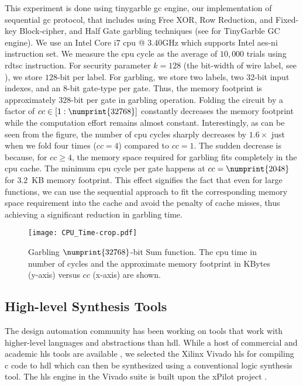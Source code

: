 This experiment is done using \gls{tinygarble} \acrshort{gc} engine, our  implementation of sequential \acrshort{gc} protocol, that includes using Free XOR, Row Reduction, and Fixed-key Block-cipher, and Half Gate garbling techniques (see  for TinyGarble GC engine).
We use an Intel Core i7 \acrshort{cpu} @ 3.40GHz which supports Intel \acrfull{aes-ni} instruction set.
We measure the \acrshort{cpu} cycle as the average of $10,000$ trials using \gls{rdtsc} instruction.
For security parameter $k=128$ (the bit-width of wire label, see ), we store $128$-bit per label.
For garbling, we store two labels, two 32-bit input indexes, and an 8-bit gate-type per gate.
Thus, the memory footprint is approximately $328$-bit per gate in garbling operation.
Folding the circuit by a factor of $cc \in [1:\numprint{32768}]$ constantly decreases the memory footprint while the computation effort remains almost constant.
Interestingly, as can be seen from the figure, the number of \acrshort{cpu} cycles sharply decreases by $1.6\times$ just when we fold four times ($cc=4$) compared to $cc=1$.
The sudden decrease is because, for $cc \geq 4$, the memory space required for garbling fits completely in the \acrshort{cpu} cache.
The minimum \acrshort{cpu} cycle per gate happens at $cc=\numprint{2048}$ for $3.2$~KB memory footprint.
This effect signifies the fact that even for large functions, we can use the sequential approach to fit the corresponding memory space requirement into the cache and avoid the penalty of cache misses, thus achieving a significant reduction in garbling time.

\begin{figure}
	\centering
	\texttt{[image: CPU\_Time-crop.pdf]}
	\caption{Garbling $\numprint{32768}$-bit Sum function.
The \acrshort{cpu} time in number of cycles and the approximate memory footprint in KBytes (y-axis) versus $cc$ (x-axis) are shown.}
	\label{fig:cpu_time}
\end{figure}

\subsection{High-level Synthesis Tools}\label{ssec:eval-tinygarble-high}
The design automation community has been working on tools that work with higher-level languages and abstractions than \acrfull{hdl}.
While a host of commercial and academic \acrfull{hls} tools are available \cite{tool:Vivado, tool:PandA, decaluwe2004myhdl, Gupta2004}, we selected the Xilinx Vivado \acrshort{hls} for compiling \gls{c} code to \acrshort{hdl} which can then be synthesized using a conventional logic synthesis tool.
The \acrshort{hls} engine in the Vivado suite is built upon the xPilot project \cite{Chapter:Zhang2008}.

